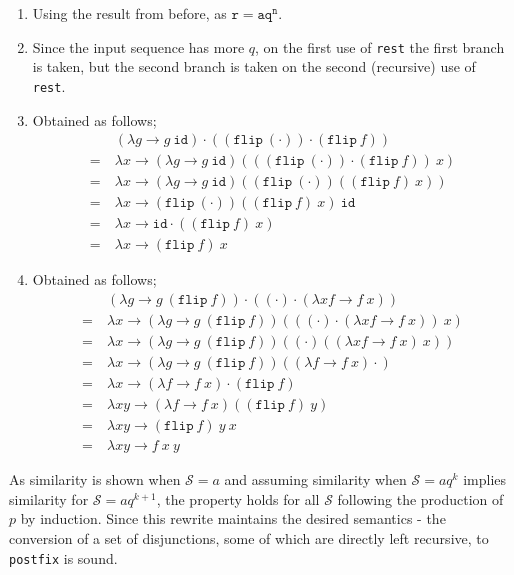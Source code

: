 \begin{enumerate}[(1)]
    \itemsep0em
    \item Using the result from before, as $\texttt{r} = \texttt{aq}^\texttt{n}$.
    \item Since the input sequence has more $q$, on the first use of \texttt{rest} the first branch is taken, but the second branch is taken on the second (recursive) use of \texttt{rest}.
    \item Obtained as follows;
        \begin{align*}
            & (\lambda g \to g\ \texttt{id}) \cdot ((\texttt{flip}\ (\cdot)) \cdot (\texttt{flip}\ f)) \\
            =\ & \lambda x \to (\lambda g \to g\ \texttt{id}) (((\texttt{flip}\ (\cdot)) \cdot (\texttt{flip}\ f))\ x) \\
            =\ & \lambda x \to (\lambda g \to g\ \texttt{id}) ((\texttt{flip}\ (\cdot)) ((\texttt{flip}\ f)\ x)) \\
            =\ & \lambda x \to (\texttt{flip}\ (\cdot)) ((\texttt{flip}\ f)\ x)\ \texttt{id} \\
            =\ & \lambda x \to \texttt{id} \cdot ((\texttt{flip}\ f)\ x) \\
            =\ & \lambda x \to (\texttt{flip}\ f)\ x
        \end{align*}
    \item Obtained as follows;
        \begin{align*}
            & (\lambda g \to g\ (\texttt{flip}\ f)) \cdot ((\cdot) \cdot (\lambda xf \to f\ x)) \\
            =\ & \lambda x \to (\lambda g \to g\ (\texttt{flip}\ f)) (((\cdot) \cdot (\lambda xf \to f\ x))\ x) \\
            =\ & \lambda x \to (\lambda g \to g\ (\texttt{flip}\ f)) ((\cdot) ((\lambda xf \to f\ x)\ x)) \\
            =\ & \lambda x \to (\lambda g \to g\ (\texttt{flip}\ f)) ((\lambda f \to f\ x) \cdot) \\
            =\ & \lambda x \to (\lambda f \to f\ x) \cdot (\texttt{flip}\ f) \\
            =\ & \lambda xy \to (\lambda f \to f\ x) ((\texttt{flip}\ f)\ y) \\
            =\ & \lambda xy \to (\texttt{flip}\ f)\ y\ x \\
            =\ & \lambda xy \to f\ x\ y
        \end{align*}
\end{enumerate}

As similarity is shown when $\mathcal{S} = a$ and assuming similarity when $\mathcal{S} = aq^k$ implies similarity for $\mathcal{S} = aq^{k + 1}$, the property holds for all $\mathcal{S}$ following the production of $p$ by induction.
Since this rewrite maintains the desired semantics - the conversion of a set of disjunctions, some of which are directly left recursive, to \texttt{postfix} is sound.
